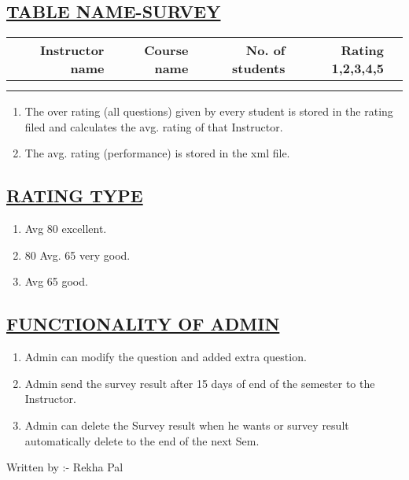 \documentclass{article}
\begin{document}
\subsection*{\underline{TABLE NAME-SURVEY}}
 \begin{tabular}{|r|r|r|r|r|}
 \hline
Instructor name & Course name  & No. of students & Rating 1,2,3,4,5   \\  \hline
&&& \\ \hline
&&& \\ \hline
\end{tabular}
\begin{enumerate}
\item The over rating (all questions) given by every student is stored in the rating filed and calculates the avg. rating of that Instructor.
\item The avg. rating (performance) is stored in the xml file.
\end{enumerate}
\subsection*{\underline{RATING TYPE}}
\begin{enumerate}
 \item Avg 80 excellent.\\
 \item 80 Avg. 65 very good.\\
 \item Avg  65 good.\\
\end{enumerate}
\subsection*{\underline{FUNCTIONALITY OF ADMIN}}
\begin{enumerate}
\item Admin can modify the question and added extra question.
\item Admin send the survey result after 15 days of end of the semester to the Instructor.
\item Admin can delete the Survey result when he wants or survey result automatically delete to the end of the next Sem.
\end{enumerate}
Written by :- Rekha Pal
\end{document}
